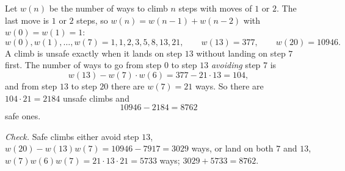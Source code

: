 Let $w(n)$ be the number of ways to climb $n$ steps with moves of $1$ or $2$. The last move is $1$ or $2$ steps, so $w(n)=w(n-1)+w(n-2)$ with $w(0)=w(1)=1$:
\[w(0),w(1),\dots,w(7)=1,1,2,3,5,8,13,21,\qquad w(13)=377,\qquad w(20)=10946.\]
A climb is unsafe exactly when it lands on step $13$ without landing on step $7$ first. The number of ways to go from step $0$ to step $13$ \emph{avoiding} step $7$ is
\[w(13)-w(7)\cdot w(6)=377-21\cdot13=104,\]
and from step $13$ to step $20$ there are $w(7)=21$ ways. So there are $104\cdot21=2184$ unsafe climbs and
\[10946-2184=\boxed{8762}\]
safe ones.

\emph{Check.} Safe climbs either avoid step $13$, $w(20)-w(13)w(7)=10946-7917=3029$ ways, or land on both $7$ and $13$, $w(7)w(6)w(7)=21\cdot13\cdot21=5733$ ways; $3029+5733=8762$.
